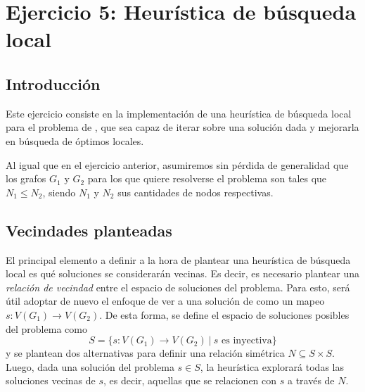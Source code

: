 \section{Ejercicio 5: Heurística de búsqueda local}


\subsection{Introducción}
Este ejercicio consiste en la implementación de una heurística de búsqueda
local para el problema de , que sea capaz de iterar sobre una
solución dada y mejorarla en búsqueda de óptimos locales.

Al igual que en el ejercicio anterior, asumiremos sin pérdida de generalidad
que los grafos $G_1$ y $G_2$ para los que quiere resolverse el problema son
tales que $N_1 \leq N_2$, siendo $N_1$ y $N_2$ sus cantidades de nodos
respectivas.

\subsection{Vecindades planteadas}

El principal elemento a definir a la hora de plantear una heurística de
búsqueda local es qué soluciones se considerarán vecinas. Es decir, es
necesario plantear una \emph{relación de vecindad} entre el espacio de
soluciones del problema. Para esto, será útil adoptar de nuevo el enfoque
de ver a una solución de  como un mapeo $s : V(G_1) \to V(G_2)$.
De esta forma, se define el espacio de soluciones posibles del problema como
\[ S = \lbrace s : V(G_1) \to V(G_2) \ \vert\ s \text{ es inyectiva}
\rbrace \]
y se plantean dos alternativas para definir una relación simétrica $N
\subseteq S \times S$.
Luego, dada una solución del problema $s \in S$, la heurística
explorará todas las soluciones vecinas de $s$, es decir, aquellas que se
relacionen con $s$ a través de $N$.

